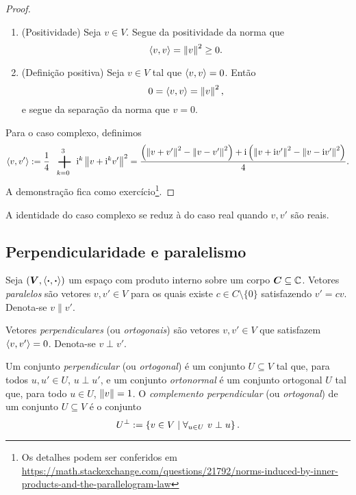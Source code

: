 \begin{proof}
\begin{enumerate}
		\item (Positividade) Seja $v \in V$. Segue da positividade da norma que
			\begin{equation*}
				\left\langle{v},{v}\right\rangle = \left\Vert{v}\right\Vert^2 \geq 0.
			\end{equation*}

		\item (Definição positiva) Seja $v \in V$ tal que $\left\langle{v},{v}\right\rangle=0$. Então
			\begin{equation*}
				0 = \left\langle{v},{v}\right\rangle = \left\Vert{v}\right\Vert^2,
			\end{equation*}
		e segue da separação da norma que $v=0$.
	\end{enumerate}

Para o caso complexo, definimos
	\begin{equation*}
	\inte{v}{v'} := \frac{1}{4} \sum_{k=0}^{3} \ii^k \nor{v+\ii^kv'}^2 = \frac{\left(\nor{v+v'}^2 - \nor{v-v'}^2\right) + \ii \left(\nor{v+\ii v'}^2 - \nor{v-\ii v'}^2\right)}{4}.
	\end{equation*}
A demonstração fica como exercício\footnote{Os detalhes podem ser conferidos em \href{https://math.stackexchange.com/questions/21792/norms-induced-by-inner-products-and-the-parallelogram-law}{https://math.stackexchange.com/questions/21792/norms-induced-by-inner-products-and-the-parallelogram-law}}.
\end{proof}

A identidade do caso complexo se reduz à do caso real quando $v,v'$ são reais.

\subsection{Perpendicularidade e paralelismo}

\begin{definition}
Seja $(\bm V,\left\langle{\bm{\cdot}},{\bm{\cdot}}\right\rangle)$ um espaço com produto interno sobre um corpo $\bm C \subseteq \mathbb{C}$. Vetores \emph{paralelos} são vetores $v,v' \in V$ para os quais existe $c \in C \setminus \{0\}$ satisfazendo $v'=cv$. Denota-se $v \parallel v'$.

Vetores \emph{perpendiculares} (ou \emph{ortogonais}) são vetores $v,v' \in V$ que satisfazem $\left\langle{v},{v'}\right\rangle=0$. Denota-se $v \perp v'$.

Um conjunto \emph{perpendicular} (ou \emph{ortogonal}) é um conjunto $U \subseteq V$ tal que, para todos $u,u' \in U$, $u \perp u'$, e um conjunto \emph{ortonormal} é um conjunto ortogonal $U$ tal que, para todo $u \in U$, $\left\Vert{v}\right\Vert=1$. O \emph{complemento perpendicular} (ou \emph{ortogonal}) de um conjunto $U \subseteq V$ é o conjunto
	\begin{equation*}
	U^\perp := \left\{{v \in V}\;\middle\vert\;{\forall_{u \in U}\ v \perp u}\right\}.
	\end{equation*}
\end{definition}

